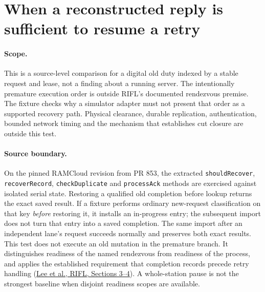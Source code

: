 \documentclass{article}
\begin{document}
\section*{When a reconstructed reply is sufficient to resume a retry}
\paragraph{Scope.} This is a source-level comparison for a digital old
duty indexed by a stable request and lease, not a finding about a
running server. The intentionally premature execution order is
outside RIFL's documented rendezvous premise. The fixture checks
why a simulator adapter must not present that order as a supported
recovery path. Physical clearance, durable replication, authentication,
bounded network timing and the mechanism that establishes cut closure
are outside this test.

\paragraph{Source boundary.}
On the pinned RAMCloud revision from PR 853, the extracted
\texttt{shouldRecover}, \texttt{recoverRecord},
\texttt{checkDuplicate} and \texttt{processAck} methods are exercised
against isolated serial state. Restoring a qualified old completion
before lookup returns the exact saved result. If a fixture performs
ordinary new-request classification on that key \emph{before}
restoring it, it installs an in-progress entry; the subsequent import
does not turn that entry into a saved completion. The same import
after an independent lane's request succeeds normally and preserves
both exact results. This test does not execute an old mutation in
the premature branch. It distinguishes readiness of the named
rendezvous from readiness of the process, and applies the established
requirement that completion records precede retry handling
(\href{https://doi.org/10.1145/2815400.2815416}{Lee et al., RIFL,
Sections 3--4}). A whole-station pause is not the strongest
baseline when disjoint readiness scopes are available.
\end{document}
